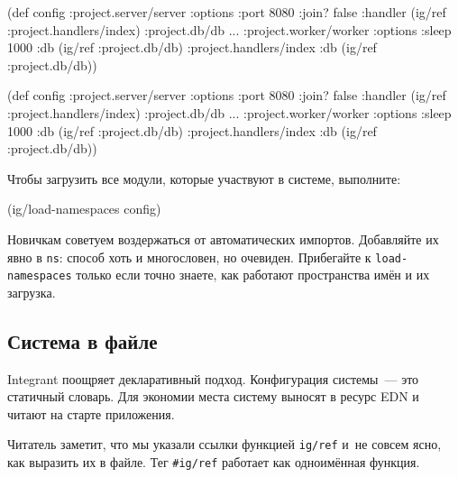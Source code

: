 \ifx\DEVICETYPE\MOBILE

\begin{english}
  \begin{clojure}
(def config
  {:project.server/server
   {:options {:port 8080 :join? false}
    :handler (ig/ref
               :project.handlers/index)}
   :project.db/db {...}
   :project.worker/worker
   {:options {:sleep 1000}
    :db      (ig/ref :project.db/db)}
   :project.handlers/index
   {:db (ig/ref :project.db/db)}})
  \end{clojure}
\end{english}

\else

\begin{english}
  \begin{clojure}
(def config
  {:project.server/server
   {:options {:port 8080 :join? false}
    :handler (ig/ref :project.handlers/index)}
   :project.db/db {...}
   :project.worker/worker
   {:options {:sleep 1000}
    :db      (ig/ref :project.db/db)}
   :project.handlers/index
   {:db (ig/ref :project.db/db)}})
  \end{clojure}
\end{english}

\fi

\noindent
Чтобы загрузить все модули, которые участвуют в системе, выполните:

\begin{english}
  \begin{clojure}
(ig/load-namespaces config)
  \end{clojure}
\end{english}

Новичкам советуем воздержаться от автоматических импортов. Добавляйте их явно в
\verb|ns|: способ хоть и многословен, но очевиден. Прибегайте к
\verb|load-namespaces| только если точно знаете, как работают пространства
имён и их загрузка.

\subsection{Система в файле}


Integrant поощряет декларативный подход. Конфигурация системы~--- это статичный
словарь. Для экономии места систему выносят в ресурс EDN и читают на старте
приложения.


Читатель заметит, что мы указали ссылки функцией \verb|ig/ref| и~не совсем
ясно, как выразить их в файле. Тег \verb|#ig/ref| работает как одноимённая
функция.

